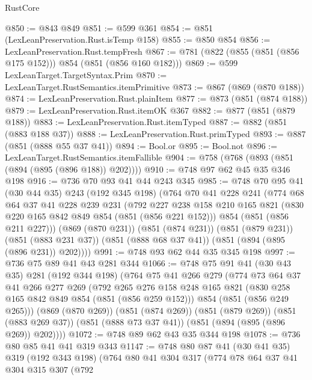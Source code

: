 \begin{lexlean}{RustCore}
\begin{coremodule}
{\begin{coremodule}
{{{{{@850 := @843 @849
@851 := @599 @361
@854 := @851 (LexLeanPreservation.Rust.isTemp @158)
@855 := @850 @854
@856 := LexLeanPreservation.Rust.tempFresh
@867 := @781 (@822 (@855 (@851 (@856 @175 @152))) @854 (@851 (@856 @160 @182)))
@869 := @599 LexLeanTarget.TargetSyntax.Prim
@870 := LexLeanTarget.RustSemantics.itemPrimitive
@873 := @867 (@869 (@870 @188))
@874 := LexLeanPreservation.Rust.plainItem
@877 := @873 (@851 (@874 @188))
@879 := LexLeanPreservation.Rust.itemOK @367
@882 := @877 (@851 (@879 @188))
@883 := LexLeanPreservation.Rust.itemTyped
@887 := @882 (@851 (@883 @188 @37))
@888 := LexLeanPreservation.Rust.primTyped
@893 := @887 (@851 (@888 @55 @37 @41))
@894 := Bool.or
@895 := Bool.not
@896 := LexLeanTarget.RustSemantics.itemFallible
@904 := @758 (@768 (@893 (@851 (@894 (@895 (@896 @188)) @202))))
@910 := @748 @97 @62 @45 @35 @346 @198
@916 := @736 @70 @93 @41 @44 @243 @345
@985 := @748
    @70
    @95
    @41
    (@30 @44 @35)
    @243
    (@192 @345 @198)
    (@764
      @70
      @41
      @228
      @241
      (@774
        @68
        @64
        @37
        @41
        @228
        @239
        @231
        (@792
          @227
          @238
          @158
          @210
          @165
          @821
          (@830 @220 @165 @842 @849 @854 (@851 (@856 @221 @152)))
          @854
          (@851 (@856 @211 @227)))
        (@869 (@870 @231))
        (@851 (@874 @231))
        (@851 (@879 @231))
        (@851 (@883 @231 @37))
        (@851 (@888 @68 @37 @41))
        (@851 (@894 (@895 (@896 @231)) @202))))
@991 := @748 @93 @62 @44 @35 @345 @198
@997 := @736 @75 @89 @41 @43 @281 @344
@1066 := @748
    @75
    @91
    @41
    (@30 @43 @35)
    @281
    (@192 @344 @198)
    (@764
      @75
      @41
      @266
      @279
      (@774
        @73
        @64
        @37
        @41
        @266
        @277
        @269
        (@792
          @265
          @276
          @158
          @248
          @165
          @821
          (@830 @258 @165 @842 @849 @854 (@851 (@856 @259 @152)))
          @854
          (@851 (@856 @249 @265)))
        (@869 (@870 @269))
        (@851 (@874 @269))
        (@851 (@879 @269))
        (@851 (@883 @269 @37))
        (@851 (@888 @73 @37 @41))
        (@851 (@894 (@895 (@896 @269)) @202))))
@1072 := @748 @89 @62 @43 @35 @344 @198
@1078 := @736 @80 @85 @41 @41 @319 @343
@1147 := @748
    @80
    @87
    @41
    (@30 @41 @35)
    @319
    (@192 @343 @198)
    (@764
      @80
      @41
      @304
      @317
      (@774
        @78
        @64
        @37
        @41
        @304
        @315
        @307
        (@792
}}}}}
\end{coremodule}}
\end{coremodule}
\end{lexlean}

